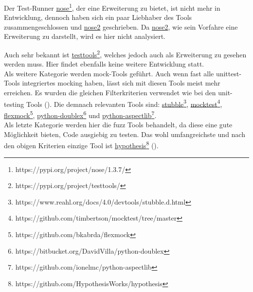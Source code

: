 Der Test-Runner
\href{https://pypi.org/project/nose/1.3.7/}{nose}\footnote{https://pypi.org/project/nose/1.3.7/},
der eine Erweiterung zu  bietet, ist nicht mehr
in Entwicklung, dennoch haben sich ein paar Liebhaber des Tools
zusammengeschlossen und
\href{https://pypi.org/project/nose2/}{nose2}
geschrieben. Da \href{https://pypi.org/project/nose2/}{nose2},
wie sein Vorfahre eine Erweiterung zu  darstellt,
wird es hier nicht analysiert.

Auch sehr bekannt ist
\href{https://pypi.org/project/testtools/}{testtools}\footnote{https://pypi.org/project/testtools/},
welches jedoch auch als Erweiterung zu  gesehen 
werden muss. Hier findet ebenfalls keine weitere Entwicklung statt.
\newline
\\
Als weitere Kategorie werden \Gls{mock}-Tools geführt. Auch wenn fast alle
unittest-Tools integriertes \gls{mock}ing haben, lässt sich mit diesen
Tools meist mehr erreichen. Es wurden die gleichen Filterkriterien verwendet
wie bei den unit-testing Tools (\cite{wiki.python:PythonTestingToolsTaxonomy}).
Die demnach relevanten Tools sind:
\href{https://www.reahl.org/docs/4.0/devtools/stubble.d.html}{stubble}\footnote{https://www.reahl.org/docs/4.0/devtools/stubble.d.html},
\href{https://github.com/timbertson/mocktest/tree/master}{mocktest}\footnote{https://github.com/timbertson/mocktest/tree/master},
\href{https://github.com/bkabrda/flexmock}{flexmock}\footnote{https://github.com/bkabrda/flexmock},
\href{https://bitbucket.org/DavidVilla/python-doublex}{python-doublex}\footnote{https://bitbucket.org/DavidVilla/python-doublex}
und 
\href{https://github.com/ionelmc/python-aspectlib}{python-aspectlib}\footnote{https://github.com/ionelmc/python-aspectlib}.
\newline
\\
Als letzte Kategorie werden hier die \Gls{fuzz} Tools behandelt, da diese eine
gute Möglichkeit bieten, Code ausgiebig zu testen. Das wohl umfangreichste und
nach den obigen Kriterien einzige Tool ist
\href{https://github.com/HypothesisWorks/hypothesis}{hypothesis}\footnote{https://github.com/HypothesisWorks/hypothesis}
(\cite{wiki.python:PythonTestingToolsTaxonomy}).




